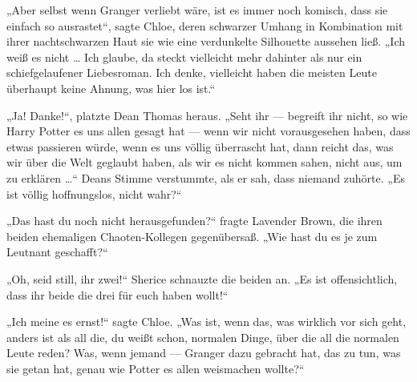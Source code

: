 „Aber selbst wenn Granger verliebt wäre, ist es immer noch komisch, dass sie einfach so ausrastet“, sagte Chloe, deren schwarzer Umhang in Kombination mit ihrer nachtschwarzen Haut sie wie eine verdunkelte Silhouette aussehen ließ.
„Ich weiß es nicht … Ich glaube, da steckt vielleicht mehr dahinter als nur ein schiefgelaufener Liebesroman. Ich denke, vielleicht haben die meisten Leute überhaupt keine Ahnung, was hier los ist.“

„Ja! Danke!“, platzte Dean Thomas heraus.
„Seht ihr — begreift ihr nicht, so wie Harry Potter es uns allen gesagt hat — wenn wir nicht vorausgesehen haben, dass etwas passieren würde, wenn es uns völlig überrascht hat, dann reicht das, was wir über die Welt geglaubt haben, als wir es nicht kommen sahen, nicht aus, um zu erklären …“ Deans Stimme verstummte, als er sah, dass niemand zuhörte.
„Es ist völlig hoffnungslos, nicht wahr?“

„Das hast du noch nicht herausgefunden?“ fragte Lavender Brown, die ihren beiden ehemaligen Chaoten-Kollegen gegenübersaß.
„Wie hast du es je zum Leutnant geschafft?“

„Oh, seid still, ihr zwei!“ Sherice schnauzte die beiden an.
„Es ist offensichtlich, dass ihr beide die drei für euch haben wollt!“

„Ich meine es ernst!“ sagte Chloe.
„Was ist, wenn das, was wirklich vor sich geht, anders ist als all die, du weißt schon, normalen Dinge, über die all die normalen Leute reden? Was, wenn jemand — Granger dazu gebracht hat, das zu tun, was sie getan hat, genau wie Potter es allen weismachen wollte?“

